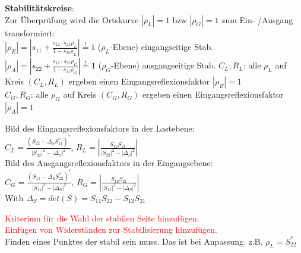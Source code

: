 \documentclass[english]{latex4ei/latex4ei_sheet}
\newcommand{\comment}[1]{\textcolor{red}{#1}}
\begin{document}
\begin{sectionbox}
	\textbf{Stabilitätskreise}:\\
	Zur Überprüfung wird die Ortskurve $\left|\rho_{L}\right|=1$ bzw $\left|\rho_{G}\right|=1$ zum Ein- /Ausgang transformiert:\\
	$\left|\rho_{E}\right|=\left|s_{11}+\frac{s_{12} \cdot s_{21} \rho_{L}}{1-s_{22} \rho_{L}}\right| \stackrel{!}{=} 1$ ($\rho_L$-Ebene) eingangseitige Stab.\\
	$\left|\rho_{A}\right|=\left|s_{22}+\frac{s_{12} \cdot s_{21} \rho_{G}}{1-s_{11} \rho_{G}}\right| \stackrel{!}{=} 1$ ($\rho_G$-Ebene) ausgangseitige Stab.
	$C_L, R_L$: alle $\rho_L$ auf Kreis $(C_L, R_L)$ ergeben einen Eingangsreflexionsfaktor $|\rho_E| = 1$\\
	$C_G, R_G$: alle $\rho_G$ auf Kreis $(C_G, R_G)$ ergeben einen Eingangsreflexionsfaktor $|\rho_A| = 1$
	\begin{emphbox}
		Bild des Eingangsreflexionsfaktors in der Lastebene:\\
		$C_{L}=\frac{\left(S_{22}-\Delta_{S} S_{11}^{*}\right)^{*}}{\left|S_{22}\right|^{2}-\left|\Delta_{S}\right|^{2}}$, 
		$R_{L}=\left|\frac{S_{12} S_{21}}{\left|S_{22}\right|^{2}-\left|\Delta_{S}\right|^{2}}\right|$\\
		Bild des Ausgangsreflexionsfaktors in der Eingangsebene:\\
		$C_{G}=\frac{\left(S_{11}-\Delta_{S} S_{22}^{*}\right)^{*}}{\left|S_{11}\right|^{2}-\left|\Delta_{S}\right|^{2}}$, $R_{G}=\left|\frac{S_{12} S_{21}}{\left|S_{11}\right|^{2}-\left|\Delta_{S}\right|^{2}}\right|$\\
		\vspace{1em}
		With $\Delta_{S} = det(S) = S_{11}S_{22}-S_{12}S_{21}$
	\end{emphbox}
	\comment{Kriterium für die Wahl der stabilen Seite hinzufügen.}\\
	\comment{Einfügen von Widerständen zur Stabilisierung hinzufügen.}\\ 
	Finden eines Punktes der stabil sein muss. Das ist bei Anpassung. z.B. $\rho_L=S^*_{22}$
\end{sectionbox}
\end{document}

